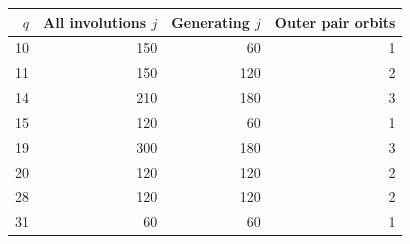 \begin{center}\begin{tabular}{r r r r}\toprule
$q$&All involutions $j$&Generating $j$&Outer pair orbits\\\midrule
10&150&60&1\\
11&150&120&2\\
14&210&180&3\\
15&120&60&1\\
19&300&180&3\\
20&120&120&2\\
28&120&120&2\\
31&60&60&1\\
\bottomrule\end{tabular}\end{center}
